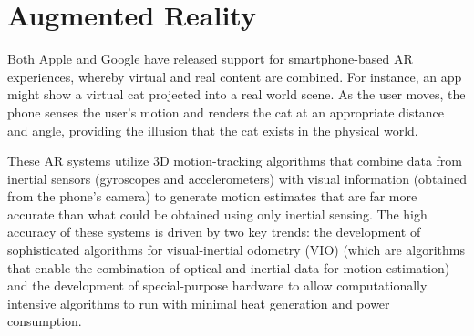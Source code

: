 \documentclass[chi_draft]{sigchi}
\newcommand{\BVI}{B/VI\xspace}
\newcommand{\OM}{O\&M\xspace}
\begin{document}

\section{Augmented Reality}
%

Both Apple and Google have released support for smartphone-based AR experiences, whereby virtual and real content are combined.  For instance, an app might show a virtual cat projected into a real world scene.  As the user moves, the phone senses the user's motion and renders the cat at an appropriate distance and angle, providing the illusion that the cat exists in the physical world.

These AR systems utilize 3D motion-tracking algorithms that combine data from inertial sensors (gyroscopes and accelerometers) with visual information (obtained from the phone's camera) to generate motion estimates that are far more accurate than what could be obtained using only inertial sensing.  The high accuracy of these systems is driven by two key trends: the development of sophisticated algorithms for visual-inertial odometry (VIO) \cite{li2013high,leutenegger2015keyframe,bloesch2015robust,forster2014svo} (which are algorithms that enable the combination of optical and inertial data for motion estimation) and the development of special-purpose hardware to allow computationally intensive algorithms to run with minimal heat generation and power consumption.%
\end{document}
